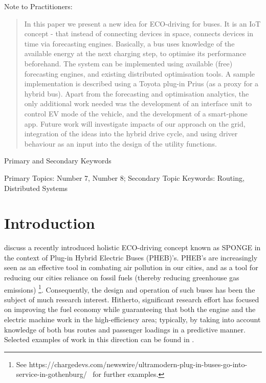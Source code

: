 \documentclass[journal]{IEEEtran}
\begin{document}
Note to Practitioners:
\begin{abstract}
In this paper we present a new idea for ECO-driving for buses. It is an IoT concept - that instead of connecting devices in space, connects devices in time via forecasting engines. Basically, a bus uses knowledge of the available energy at the next charging step, to optimise its performance beforehand. The system can be implemented using available (free) forecasting engines, and existing distributed optimisation tools. A sample implementation is described using a Toyota plug-in 
Prius (as a proxy for a hybrid bus). Apart from the forecasting and optimisation analytics, the only additional work needed was the development of an interface unit to control EV mode of the vehicle, and the development of a smart-phone app. Future work will investigate impacts of our approach on the grid, integration of the ideas into the hybrid drive cycle, and using driver behaviour as an input into the design of the utility functions.
\end{abstract}

Primary and Secondary Keywords
\begin{IEEEkeywords}
Primary Topics: Number 7, Number 8; 
Secondary Topic Keywords: Routing, Distributed Systems 
\end{IEEEkeywords}




\IEEEpeerreviewmaketitle



\section{Introduction}
 discuss a recently introduced holistic ECO-driving concept known as SPONGE in the context of Plug-in Hybrid Electric Buses (PHEB)'s. PHEB's are increasingly seen as an effective tool in combating air pollution in our cities, and as a tool for reducing our cities reliance on fossil fuels (thereby reducing greenhouse gas emissions) \cite{PHEBs, Example_US}\footnote{See https://chargedevs.com/newswire/ultramodern-plug-in-buses-go-into-service-in-gothenburg/~ for further examples.}. Consequently, the design and operation of such buses has been the subject of much research interest.  Hitherto, significant research effort has focused on improving the fuel economy while guaranteeing that both the engine and the electric machine work in the high-efficiency area; typically, by taking into account knowledge of both bus routes and passenger loadings in a predictive manner. Selected examples of work in this direction can be found in \cite{Tianheng2015, Li2015, Li2016}. 
\end{document}
